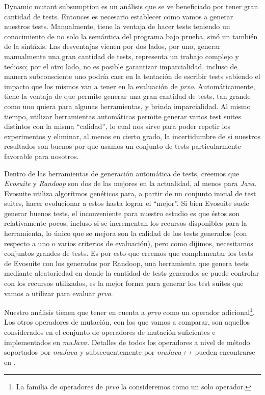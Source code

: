 Dynamic mutant subsumption es un an\'alisis que se ve beneficiado por tener gran cantidad de tests. Entonces es necesario establecer como vamos a generar nuestros tests. Manualmente, tiene la ventaja de hacer tests teniendo un conocimiento de no solo la sem\'antica del programa bajo prueba, sin\'o un tambi\'en de la sint\'axis. Las desventajas vienen por dos lados, por uno, generar manualmente una gran cantidad de tests, representa un trabajo complejo y tedioso; por el otro lado, no es posible garantizar imparcialidad, incluso de manera subconsciente uno podr\'ia caer en la tentaci\'on de escribir tests sabiendo el impacto que los mismos van a tener en la evaluaci\'on de \emph{prvo}. Autom\'aticamente, tiene la ventaja de que permite generar una gran cantidad de tests, tan grande como uno quiera para algunas herramientas, y brinda imparcialidad. Al mismo tiempo, utilizar herramientas autom\'aticas permite generar varios test suites distintos con la misma ``calidad'', lo cual nos sirve para poder repetir los experimentos y eliminar, al menos en cierto grado, la incertidumbre de si nuestros resultados son buenos por que usamos un conjunto de tests particularmente favorable para nosotros. 

Dentro de las herramientas de generaci\'on autom\'atica de tests, creemos que \emph{Evosuite} y \emph{Randoop} son dos de las mejores en la actualidad, al menos para \emph{Java}. Evosuite utiliza algor\'itmos gen\'eticos para, a partir de un conjunto inicial de test suites, hacer evolucionar a estos hasta lograr el ``mejor''. Si bien Evosuite suele generar buenos tests, el inconveniente para nuestro estudio es que \'estos son relativamente pocos, incluso si se incrementan los recursos disponibles para la herramienta, lo \'unico que se mejora son la calidad de los tests generados (con respecto a uno o varios criterios de evaluaci\'on), pero como dijimos, necesitamos conjuntos grandes de tests. Es por esto que creemos que complementar los tests de Evosuite con los generados por Randoop, una herramienta que genera tests mediante aleatoriedad en donde la cantidad de tests generados se puede controlar con los recursos utilizados, es la mejor forma para generar los test suites que vamos a utilizar para evaluar \emph{prvo}.

Nuestro an\'alisis tienen que tener en cuenta a \emph{prvo} como un operador adicional\footnote{La familia de operadores de \emph{prvo} la consideremos como un solo operador.}. Los otros operadores de mutaci\'on, con los que vamos a comparar, son aquellos considerados en el conjunto de operadores de mutaci\'on suficientes \cite{bibliography.mutation.selection.Offutt96, bibliography.mutation.selection.ASN2008} e implementados en \emph{mu$Java$}. Detalles de todos los operadores a nivel de m\'etodo soportados por \emph{mu$Java$} y subsecuentemente por \emph{mu$Java$++} pueden encontrarse en \cite{muJavaMOPS}. 


